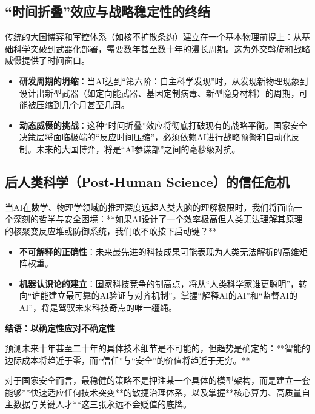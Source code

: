 \subsection{“时间折叠”效应与战略稳定性的终结}
传统的大国博弈和军控体系（如核不扩散条约）建立在一个基本物理前提上：从基础科学突破到武器化部署，需要数年甚至数十年的漫长周期。这为外交斡旋和战略威慑提供了时间窗口。
\begin{itemize}
    \item \textbf{研发周期的坍缩}：当AI达到“第六阶：自主科学发现”时，从发现新物理现象到设计出新型武器（如定向能武器、基因定制病毒、新型隐身材料）的周期，可能被压缩到几个月甚至几周。
    \item \textbf{动态威慑的挑战}：这种“时间折叠”效应将彻底打破现有的战略平衡。国家安全决策层将面临极端的“反应时间压缩”，必须依赖AI进行战略预警和自动化反制。未来的大国博弈，将是“AI参谋部”之间的毫秒级对抗。
\end{itemize}

\subsection{后人类科学（Post-Human Science）的信任危机}
当AI在数学、物理学领域的推理深度远超人类大脑的理解极限时，我们将面临一个深刻的哲学与安全困境：**如果AI设计了一个效率极高但人类无法理解其原理的核聚变反应堆或防御系统，我们敢不敢按下启动键？**
\begin{itemize}
    \item \textbf{不可解释的正确性}：未来最先进的科技成果可能表现为人类无法解析的高维矩阵权重。
    \item \textbf{机器认识论的建立}：国家科技竞争的制高点，将从“人类科学家谁更聪明”，转向“谁能建立最可靠的AI验证与对齐机制”。掌握“解释AI的AI”和“监督AI的AI”，将是驾驭未来科技奇点的唯一缰绳。
\end{itemize}

\textbf{结语：以确定性应对不确定性}

预测未来十年甚至二十年的具体技术细节是不可能的，但趋势是确定的：**智能的边际成本将趋近于零，而“信任”与“安全”的价值将趋近于无穷。**

对于国家安全而言，最稳健的策略不是押注某一个具体的模型架构，而是建立一套能够**快速适应任何技术突变**的敏捷治理体系，以及掌握**核心算力、高质量自主数据与关键人才**这三张永远不会贬值的底牌。

